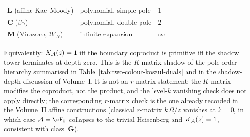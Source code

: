 \begin{remark}
\begin{center}
\begin{tabular}{lll}
$\mathbf{L}$ (affine Kac--Moody) & polynomial, simple pole & $1$ \\
$\mathbf{C}$ ($\beta\gamma$) & polynomial, double pole & $2$ \\
$\mathbf{M}$ (Virasoro, $\mathcal{W}_N$) & infinite expansion & $\infty$ \\
\bottomrule
\end{tabular}
\end{center}
Equivalently: $K_{\mathcal{A}}(z) = 1$ iff the boundary coproduct is primitive iff the shadow tower terminates at depth zero. This is the $K$-matrix shadow of the pole-order hierarchy summarised in Table~\ref{tab:two-colour-koszul-duals} and in the shadow-depth discussion of Volume~I. It is not an $r$-matrix statement: the $K$-matrix modifies the coproduct, not the product, and the level-$k$ vanishing check does not apply directly; the corresponding $r$-matrix check is the one already recorded in the Volume~II affine constructions (classical $r$-matrix $k\,\Omega/z$ vanishes at $k=0$, in which case $\cA = \cH_0$ collapses to the trivial Heisenberg and $K_{\mathcal{A}}(z) = 1$, consistent with class~$\mathbf{G}$).
\end{remark}

